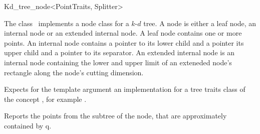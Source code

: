 

\begin{ccRefClass}{Kd_tree_node<PointTraits, Splitter>}  %


\begin{ccAdvanced}

\ccDefinition
  
The class \ccRefName\ implements a node class for a $k$-$d$ tree. 
A node is either a leaf node, an internal node or an extended internal node.
A leaf node contains one or more points. An internal node contains a pointer
to its lower child and a pointer its upper child and a pointer to its separator.
An extended internal node is an internal node containing the lower and 
upper limit of an exteneded node's rectangle
along the node's cutting dimension.



Expects for the template argument an implementation for a tree traits class
of the concept ,
for example .

\ccTypes




\ccCreation
{}  %



\ccOperations

{Reports the points from the subtree of the node, that are approximately contained by q.} 


\end{ccAdvanced}
\end{ccRefClass}
